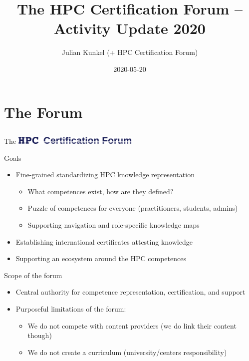 \documentclass[compress,aspectratio=169]{beamer}
\subtitle{}
\title{\Large The HPC Certification Forum -- Activity Update 2020}
\author{Julian Kunkel (+ HPC Certification Forum)}
\date{2020-05-20}
\institute{Department of Computer Science}
\begin{document}
\begin{frame}[plain]{}
	\maketitle
\end{frame}




\section{The Forum}
\subsection{}



\begin{frame}{The \includegraphics[width=0.45\textwidth]{hpccf-full}}
		\begin{block}{Goals}
			\begin{itemize}
				\item Fine-grained standardizing HPC knowledge representation
          \begin{itemize}
            \item What competences exist, how are they defined?
            \item Puzzle of competences for everyone (practitioners, students, admins)
            \item Supporting navigation and role-specific knowledge maps
          \end{itemize}
				\item Establishing international certificates attesting knowledge
        \item Supporting an ecosystem around the HPC competences
			\end{itemize}
		\end{block}

    \begin{block}{Scope of the forum}
    \begin{itemize}
      \item Central authority for competence representation, certification, and support
      \item Purposeful limitations of the forum:
			\begin{itemize}
				\item We do not compete with content providers (we do link their content though)
				\item We do not create a curriculum (university/centers responsibility)
			\end{itemize}
    \end{itemize}
		\end{block}
\end{frame}
\end{document}
